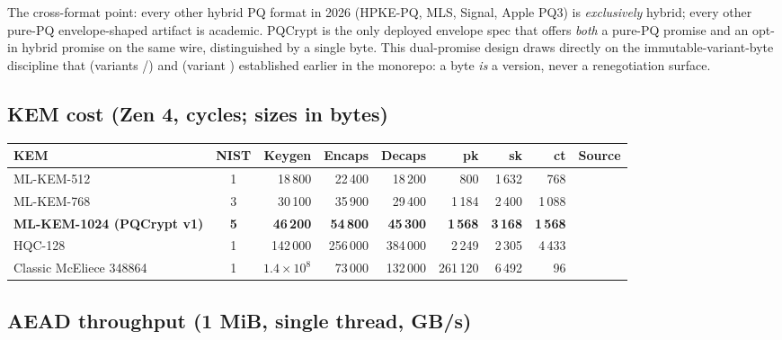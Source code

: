 The cross-format point: every other hybrid PQ format in 2026 (HPKE-PQ, MLS, Signal, Apple PQ3) is \emph{exclusively} hybrid; every other pure-PQ envelope-shaped artifact is academic. PQCrypt is the only deployed envelope spec that offers \emph{both} a pure-PQ promise and an opt-in hybrid promise on the same wire, distinguished by a single byte. This dual-promise design draws directly on the immutable-variant-byte discipline that \pqid{} (variants /) and \pqhash{} (variant ) established earlier in the \pqtoolkit{} monorepo: a byte \emph{is} a version, never a renegotiation surface.

\subsection{KEM cost (Zen 4, cycles; sizes in bytes)}

\begin{center}
\small
\begin{tabular}{@{}lcrrrrrrl@{}}
\toprule
\textbf{KEM} & \textbf{NIST} & \textbf{Keygen} & \textbf{Encaps} & \textbf{Decaps} & \textbf{pk} & \textbf{sk} & \textbf{ct} & \textbf{Source} \\
\midrule
ML-KEM-512  & 1 & 18\,800 & 22\,400 & 18\,200 & 800   & 1\,632 & 768   & \citep{mlkem-native-bench} \\
ML-KEM-768  & 3 & 30\,100 & 35\,900 & 29\,400 & 1\,184 & 2\,400 & 1\,088 & \citep{mlkem-native-bench} \\
\textbf{ML-KEM-1024 (PQCrypt v1)} & \textbf{5} & \textbf{46\,200} & \textbf{54\,800} & \textbf{45\,300} & \textbf{1\,568} & \textbf{3\,168} & \textbf{1\,568} & \citep{mlkem-native-bench} \\
HQC-128 & 1 & 142\,000 & 256\,000 & 384\,000 & 2\,249 & 2\,305 & 4\,433 & \citep{hqc-perf} \\
Classic McEliece 348864 & 1 & $1.4 \times 10^8$ & 73\,000 & 132\,000 & 261\,120 & 6\,492 & 96 & \citep{mceliece} \\
\bottomrule
\end{tabular}
\end{center}

\subsection{AEAD throughput (1 MiB, single thread, GB/s)}

